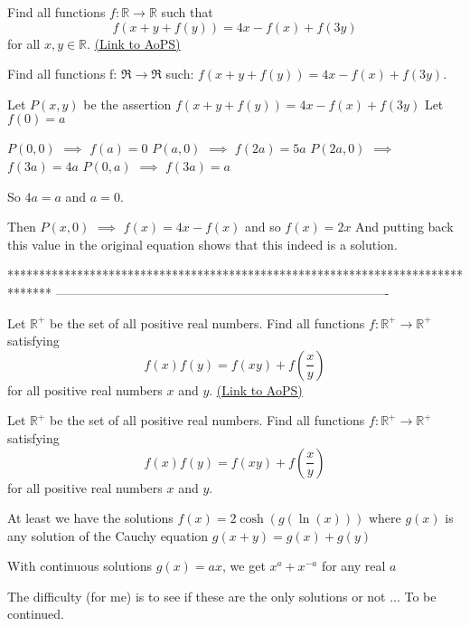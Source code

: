 \begin{problem}
	Find all functions $f: \mathbb R \to \mathbb R$ such that \[ f(x+y+f(y))=4x-f(x)+f(3y)\] for all $x, y \in \mathbb R$.
	\flushright \href{https://artofproblemsolving.com/community/c6h291010}{(Link to AoPS)}
\end{problem}



\begin{solution}
	\begin{tcolorbox}Find all functions f: $ \Re\to\Re$ such: $ f(x + y + f(y)) = 4x - f(x) + f(3y)$.\end{tcolorbox}

Let $ P(x,y)$ be the assertion $ f(x+y+f(y))=4x-f(x)+f(3y)$
Let $ f(0)=a$

$ P(0,0)$ $ \implies$ $ f(a)=0$
$ P(a,0)$ $ \implies$ $ f(2a)=5a$
$ P(2a,0)$ $ \implies$ $ f(3a)=4a$
$ P(0,a)$ $ \implies$ $ f(3a)=a$

So $ 4a=a$ and $ a=0$.

Then $ P(x,0)$ $ \implies$ $ f(x)=4x-f(x)$ and so $ \boxed{f(x)=2x}$ 
And putting back this value in the original equation shows that this indeed is a solution.
\end{solution}
*******************************************************************************
-------------------------------------------------------------------------------

\begin{problem}
	Let $ \mathbb{R}^ +$ be the set of all positive real numbers. Find all functions $ f: \mathbb{R}^ + \rightarrow \mathbb{R}^ +$ satisfying
\[ f(x)f(y) = f(xy) + f\left(\frac {x}{y}\right)\]
for all positive real numbers $ x$ and $ y$.
	\flushright \href{https://artofproblemsolving.com/community/c6h291897}{(Link to AoPS)}
\end{problem}



\begin{solution}
	\begin{tcolorbox}Let $ \mathbb{R}^ +$ be the set of all positive real numbers. Find all functions $ f: \mathbb{R}^ + \rightarrow \mathbb{R}^ +$ satisfying
\[ f(x)f(y) = f(xy) + f\left(\frac {x}{y}\right)\]
for all positive real numbers $ x$ and $ y$.\end{tcolorbox}

At least we have the solutions $ f(x)=2\cosh(g(\ln(x)))$ where $ g(x)$ is any solution of the Cauchy equation $ g(x+y)=g(x)+g(y)$

With continuous solutions $ g(x)=ax$, we get $ x^a+x^{-a}$ for any real $ a$

The difficulty (for me) is to see if these are the only solutions or not ...
To be continued.
\end{solution}



